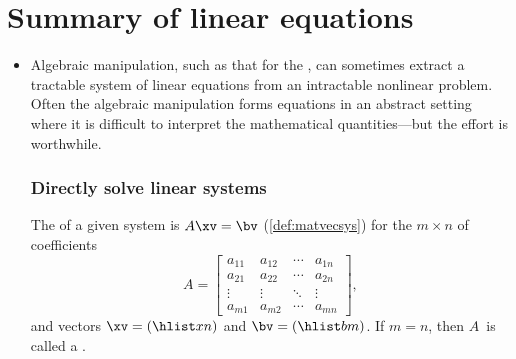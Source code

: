 
\section{Summary of linear equations}
\label{sec:sumle}

\begin{itemize}
\def\index#1{}%


\subsubsection{Introduction to systems of linear equations}


\itemhi A  in the \(n\)~variables \(x_1,x_2,\ldots,x_n\) is an equation that can be written in the form (\autoref{def:lineqn})
\begin{equation*}
\lincomb axn=b\,.
\end{equation*}
A  of linear equations is a set of one or more linear equations in one or more variables.


\item Algebraic manipulation, such as that for the \gps, can sometimes extract a tractable system of linear equations from an intractable nonlinear problem.
Often the algebraic manipulation forms equations in an abstract setting where it is difficult to interpret the mathematical quantities---but the effort is worthwhile.



\subsubsection{Directly solve linear systems}

\itemme The  of a given system is \(A\xv=\bv\) (\autoref{def:matvecsys}) for the \(m\times n\)  of coefficients
\begin{equation*}
A=\begin{bmatrix} a_{11}&a_{12}&\cdots&a_{1n}
\\a_{21}&a_{22}&\cdots&a_{2n}
\\\vdots&\vdots&\ddots&\vdots
\\a_{m1}&a_{m2}&\cdots&a_{mn} \end{bmatrix},
\end{equation*}
and vectors \(\xv=(\hlist xn)\) and \(\bv=(\hlist bm)\).
If \(m=n\), then \(A\)~is called a .


\end{itemize}
